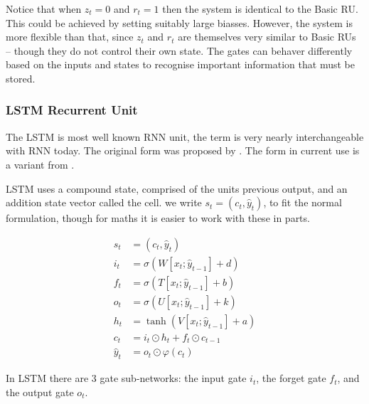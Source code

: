 \documentclass[12pt,parskip]{komatufte}\right
\begin{document}
Notice that when $z_t=0$ and $r_t=1$ then the system is identical to the Basic RU.
This could be achieved by setting suitably large biasses.
However, the system is more flexible than that, 
since $z_t$ and $r_t$ are themselves very similar to Basic RUs -- though they do not control their own state.
The gates can behaver differently based on the inputs and states to recognise important information that must be stored.



\subsubsection{LSTM Recurrent Unit}\label{sec:ltsm}
The LSTM is most well known RNN unit, the term is very nearly interchangeable with RNN today.
The original form was proposed by .
The form in current use is a variant from .

LSTM uses a compound state, comprised of the units previous output, and an addition state vector called the cell.
we write $s_t = (c_t, \hat{y}_t)$,
to fit the normal formulation,
though for maths it is easier to work with these in parts.


\begin{align}
s_t &= (c_t, \hat{y}_t)\\
%
i_t &= \sigma \left( W[x_t; \hat{y}_{t-1}] + d \right) \\
f_t &= \sigma \left( T[x_t; \hat{y}_{t-1}] + b \right) \\
o_t &= \sigma \left( U[x_t; \hat{y}_{t-1}] + k \right) \\
%
h_t &= \tanh \left( V[x_t; \hat{y}_{t-1}] + a \right) \\
c_t &=  i_t\odot h_{t} + f_t \odot c_{t-1} \\
\hat{y}_t &= o_t \odot \varphi(c_t)
\end{align}



In LSTM there are 3 gate sub-networks:
the input gate $i_t$, the forget gate $f_t$, and the output gate $o_t$.
\end{document}
